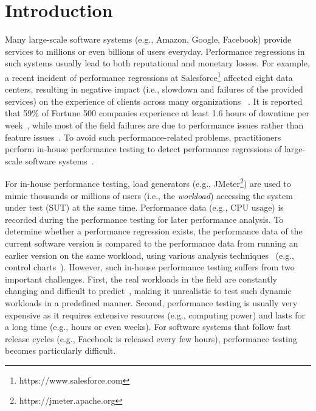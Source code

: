 \section{Introduction} \label{sec:intro}

Many large-scale software systems (e.g., Amazon, Google, Facebook) provide services to millions or even billions of users everyday.
Performance regressions in such systems usually lead to both reputational and monetary losses. 
For example, a recent incident of performance regressions at Salesforce\footnote{https://www.salesforce.com} affected eight  data centers, resulting in negative impact (i.e., slowdown and failures of the provided services) on the experience of clients across many organizations ~\citep{SaleForcePerfDegradation2019}.
It is reported that 59\% of Fortune 500 companies experience at least 1.6 hours of downtime per week~\citep{SyncsortWhitePaper2018}, while most of the field failures are due to performance issues rather than feature issues~\citep{DBLP:journals/tse/WeyukerV00}.
To avoid such performance-related problems, practitioners perform in-house performance testing to detect performance regressions of large-scale software systems~\citep{DBLP:journals/tse/JiangH15}.


For in-house performance testing, load generators (e.g., JMeter\footnote{https://jmeter.apache.org}) are used to mimic thousands or millions of users (i.e., the \emph{workload}) accessing the system under test (SUT) at the same time.
Performance data (e.g., CPU usage) is recorded during the performance testing for later performance analysis.
To determine whether a performance regression exists, the performance data of the current software version is compared to the performance data from running an earlier version on the same workload, using various analysis techniques~\citep{DBLP:conf/icst/GaoJBL16} (e.g., control charts~\citep{DBLP:conf/wosp/NguyenAJHNF12}).
However, such in-house performance testing suffers from two important challenges.
First, the real workloads in the field are constantly changing and difficult to predict~\citep{DBLP:conf/wosp/SyerJNHNF14}, making it unrealistic to test such dynamic workloads in a predefined manner.
Second, performance testing is usually very expensive as it requires extensive resources (e.g., computing power) and lasts for a long time (e.g., hours or even weeks).
For software systems that follow fast release cycles (e.g., Facebook is released every few hours), performance testing becomes particularly difficult.

